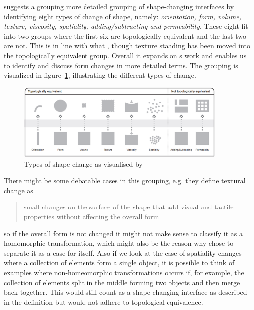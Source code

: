 \citeauthor{rasmussen2012shape} suggests a grouping more detailed grouping of shape-changing interfaces by identifying eight types of change of shape, namely: \textit{orientation, form, volume, texture, viscosity, spatiality, adding/subtracting and permeability}.
These eight fit into two groups where the first six are topologically equivalent and the last two are not. This is in line with what \citeauthor{coelho2011shape}, though texture standing has been moved into the topologically equivalent group. Overall it expands on \citeauthor{coelho2011shape}s work and enables us to identify and discuss form changes in more detailed terms.
The grouping is visualized in figure~\ref{types-of-change}, illustrating the different types of change.

\begin{figure}[hb]
	\centering
  		\includegraphics[width=4in]{figures/types-of-change}
	\caption[Types of shape-change as visualised by \citep{rasmussen2012shape}]
   {Types of shape-change as visualised by \citep{rasmussen2012shape}}
   \label{types-of-change}
\end{figure}

There might be some debatable cases in this grouping, e.g. they define textural change as
\begin{quotation}
small changes on the surface of the shape that add visual and tactile properties without affecting the overall form
\end{quotation} 
so if the overall form is not changed it might not make sense to classify it as a homomorphic transformation, which might also be the reason why \citeauthor{coelho2011shape} chose to separate it as a case for itself.
Also if we look at the case of spatiality changes where a collection of elements form a single object, it is possible to think of examples where non-homeomorphic transformations occurs if, for example, the collection of elements split in the middle forming two objects and then merge back together.
This would still count as a shape-changing interface as described in the definition but would not adhere to topological equivalence.   


